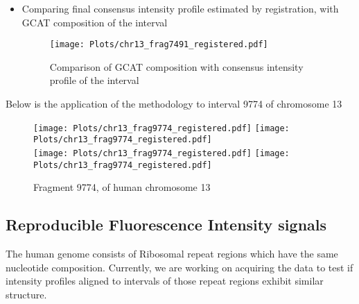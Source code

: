 \begin{itemize}
\item Comparing final consensus intensity profile estimated by registration, with GCAT composition of the interval
\begin{figure}[H]
\begin{center}
\texttt{[image: Plots/chr13\_frag7491\_registered.pdf]}
\end{center}
\caption{Comparison of GCAT composition with consensus intensity profile of the interval}
\label{fig:Frag7491_Compare}
\end{figure}
\end{itemize}

\newpage
Below is the application of the methodology to interval 9774 of chromosome 13
\begin{figure}[H]
\begin{center}
\texttt{[image: Plots/chr13\_frag9774\_registered.pdf]}
\texttt{[image: Plots/chr13\_frag9774\_registered.pdf]} \\
\texttt{[image: Plots/chr13\_frag9774\_registered.pdf]} 
\texttt{[image: Plots/chr13\_frag9774\_registered.pdf]}
\end{center}
\caption{Fragment 9774, of human chromosome 13}
\label{fig:Frag9774_All}
\end{figure}

\subsection{Reproducible Fluorescence Intensity signals}
\begin{tcolorbox}[colback=green!5,colframe=green!40!black,title=Work in progress] %
The human genome consists of Ribosomal repeat regions which have the same nucleotide composition. Currently, we are working on acquiring the data to test if intensity profiles aligned to intervals of those repeat regions exhibit similar structure.
\end{tcolorbox}





